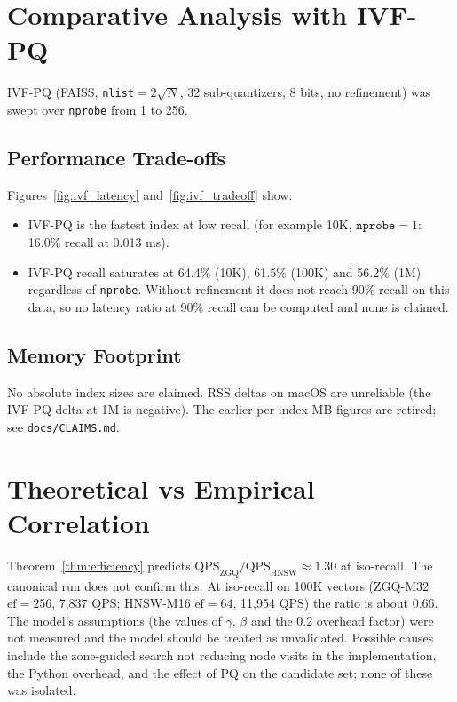 \documentclass[11pt,a4paper]{article}
\newcommand{\qps}{\text{QPS}}
\newcommand{\ef}{\text{ef}}
\newcommand{\zgq}{\text{ZGQ}}
\newcommand{\hnsw}{\text{HNSW}}
\begin{document}
\section{Comparative Analysis with IVF-PQ}

IVF-PQ (FAISS, \texttt{nlist}$=2\sqrt{N}$, 32 sub-quantizers, 8 bits, no refinement) was swept over \texttt{nprobe} from 1 to 256.

\subsection{Performance Trade-offs}
Figures~\ref{fig:ivf_latency} and~\ref{fig:ivf_tradeoff} show:
\begin{itemize}
    \item IVF-PQ is the fastest index at low recall (for example 10K, $\texttt{nprobe}=1$: 16.0\% recall at 0.013 ms).
    \item IVF-PQ recall saturates at 64.4\% (10K), 61.5\% (100K) and 56.2\% (1M) regardless of \texttt{nprobe}. Without refinement it does not reach 90\% recall on this data, so no latency ratio at 90\% recall can be computed and none is claimed.
\end{itemize}

\subsection{Memory Footprint}
No absolute index sizes are claimed. RSS deltas on macOS are unreliable (the IVF-PQ delta at 1M is negative). The earlier per-index MB figures are retired; see \texttt{docs/CLAIMS.md}.

\section{Theoretical vs Empirical Correlation}

Theorem~\ref{thm:efficiency} predicts $\qps_{\zgq}/\qps_{\hnsw} \approx 1.30$ at iso-recall. The canonical run does not confirm this. At iso-recall on 100K vectors (ZGQ-M32 $\ef=256$, 7,837 QPS; HNSW-M16 $\ef=64$, 11,954 QPS) the ratio is about 0.66. The model's assumptions (the values of $\gamma$, $\beta$ and the 0.2 overhead factor) were not measured and the model should be treated as unvalidated. Possible causes include the zone-guided search not reducing node visits in the implementation, the Python overhead, and the effect of PQ on the candidate set; none of these was isolated.
\end{document}
